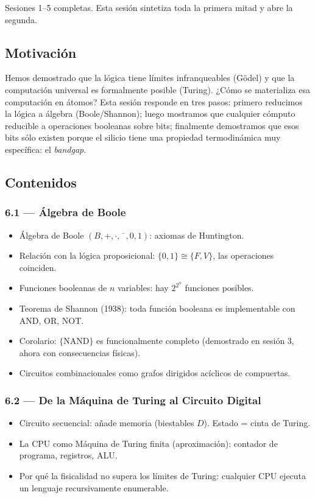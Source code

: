 \documentclass[11pt, letterpaper]{article}
\begin{document}
\begin{prereqs}
Sesiones 1--5 completas. Esta sesión sintetiza toda la primera mitad y abre la segunda.
\end{prereqs}

\subsection*{Motivación}
Hemos demostrado que la lógica tiene límites infranqueables (Gödel) y que la computación universal es formalmente posible (Turing). ¿Cómo se materializa esa computación en átomos? Esta sesión responde en tres pasos: primero reducimos la lógica a álgebra (Boole/Shannon); luego mostramos que cualquier cómputo reducible a operaciones booleanas sobre bits; finalmente demostramos que esos bits sólo existen porque el silicio tiene una propiedad termodinámica muy específica: el \emph{bandgap}.

\subsection{Contenidos}

\subsubsection{6.1 — Álgebra de Boole}
\begin{itemize}
  \item Álgebra de Boole $(B,+,\cdot,\bar{\phantom{x}},0,1)$: axiomas de Huntington.
  \item Relación con la lógica proposicional: $\{0,1\}\cong\{F,V\}$, las operaciones coinciden.
  \item Funciones booleanas de $n$ variables: hay $2^{2^n}$ funciones posibles.
  \item Teorema de Shannon (1938): toda función booleana es implementable con AND, OR, NOT.
  \item Corolario: $\{\text{NAND}\}$ es funcionalmente completo (demostrado en sesión 3, ahora con consecuencias físicas).
  \item Circuitos combinacionales como grafos dirigidos acíclicos de compuertas.
\end{itemize}

\subsubsection{6.2 — De la Máquina de Turing al Circuito Digital}
\begin{itemize}
  \item Circuito secuencial: añade memoria (biestables $D$). Estado = cinta de Turing.
  \item La CPU como Máquina de Turing finita (aproximación): contador de programa, registros, ALU.
  \item Por qué la fisicalidad no supera los límites de Turing: cualquier CPU ejecuta un lenguaje recursivamente enumerable.
\end{itemize}
\end{document}
